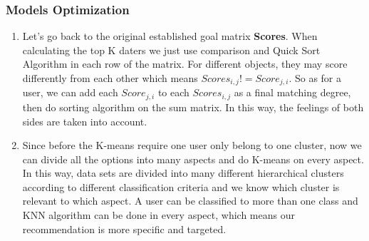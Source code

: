 \subsubsection{Models Optimization }

\begin{enumerate}
	\item Let's go back to the original established goal matrix \textbf{Scores}. When calculating the top K daters we just use comparison and Quick Sort Algorithm in each row of the matrix. For different objects, they may score differently from each other which means $Scores_{i,j} != Score_{j,i}$. So as for a user, we can add each $Score_{j,i}$ to each $Scores_{i,j}$ as a final matching degree, then do sorting algorithm on the sum matrix. In this way, the feelings of both sides are taken into account.
	\item Since before the K-means require one user only belong to one cluster, now we can divide all the options into many aspects and do K-means on every aspect. In this way, data sets are divided into many different hierarchical clusters according to different classification criteria and we know which cluster is relevant to which aspect. A user can be classified to more than one class and KNN algorithm can be done in every aspect, which means our recommendation is more specific and targeted.
	
\end{enumerate}

%	


